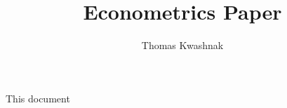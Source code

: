 \documentclass{article}
\title{Econometrics Paper}
\author{Thomas Kwashnak}
\begin{document}
\maketitle

This document
\end{document}

